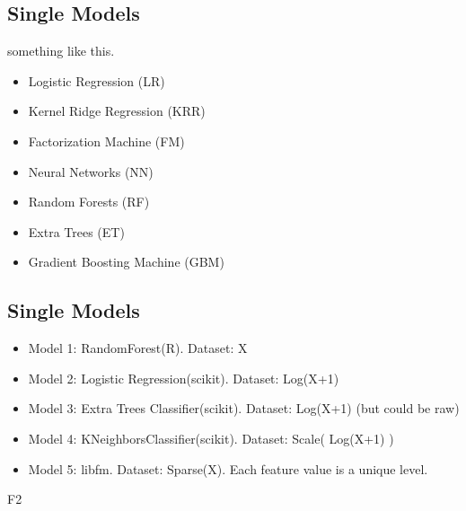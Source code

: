 \subsection{Single Models}
something like this.

\begin{itemize}
\setlength\itemsep{0em}
\item Logistic Regression (LR)
\item Kernel Ridge Regression (KRR)
\item Factorization Machine (FM)
\item Neural Networks (NN)
\item Random Forests (RF)
\item Extra Trees (ET)
\item Gradient Boosting Machine (GBM)
\end{itemize}

\subsection{Single Models}
\begin{itemize}
  \setlength\itemsep{0em}
  \item Model 1: RandomForest(R). Dataset: X
  \item Model 2: Logistic Regression(scikit). Dataset: Log(X+1)
  \item Model 3: Extra Trees Classifier(scikit). Dataset: Log(X+1) (but could be raw)
  \item Model 4: KNeighborsClassifier(scikit). Dataset: Scale( Log(X+1) )
  \item Model 5: libfm. Dataset: Sparse(X). Each feature value is a unique level.
\end{itemize}
F2
